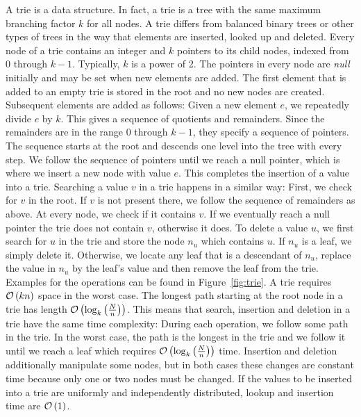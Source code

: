 A trie \cite{knuth:tries} is a data structure.
In fact, a trie is a tree with the same maximum branching factor $k$ for all nodes.
A trie differs from balanced binary trees or other types of trees in the way that elements are inserted, looked up and deleted.
Every node of a trie contains an integer and $k$ pointers to its child nodes, indexed from 0 through $k - 1$.
Typically, $k$ is a power of 2.
The pointers in every node are \emph{null} initially and may be set when new elements are added.
The first element that is added to an empty trie is stored in the root and no new nodes are created.
Subsequent elements are added as follows:
Given a new element $e$, we repeatedly divide $e$ by $k$.
This gives a sequence of quotients and remainders.
Since the remainders are in the range 0 through $k - 1$, they specify a sequence of pointers.
The sequence starts at the root and descends one level into the tree with every step.
We follow the sequence of pointers until we reach a null pointer, which is where we insert a new node with value $e$.
This completes the insertion of a value into a trie.
Searching a value $v$ in a trie happens in a similar way:
First, we check for $v$ in the root.
If $v$ is not present there, we follow the sequence of remainders as above.
At every node, we check if it contains $v$.
If we eventually reach a null pointer the trie does not contain $v$, otherwise it does.
To delete a value $u$, we first search for $u$ in the trie and store the node $n_u$ which contains $u$.
If $n_u$ is a leaf, we simply delete it.
Otherwise, we locate any leaf that is a descendant of $n_u$, replace the value in $n_u$ by the leaf's value and then remove the leaf from the trie.
Examples for the operations can be found in Figure~\ref{fig:trie}.
A trie requires $\mathcal{O}\left(kn\right)$ space in the worst case.
The longest path starting at the root node in a trie has length $\mathcal{O}\left(\log_k\left( \frac{N}{n} \right)\right)$.
This means that search, insertion and deletion in a trie have the same time complexity:
During each operation, we follow some path in the trie.
In the worst case, the path is the longest in the trie and we follow it until we reach a leaf which requires $\mathcal{O}\left(\log_k\left( \frac{N}{n} \right)\right)$ time.
Insertion and deletion additionally manipulate some nodes, but in both cases these changes are constant time because only one or two nodes must be changed.
If the values to be inserted into a trie are uniformly and independently distributed, lookup and insertion time are $\mathcal{O}\left(1\right)$.
